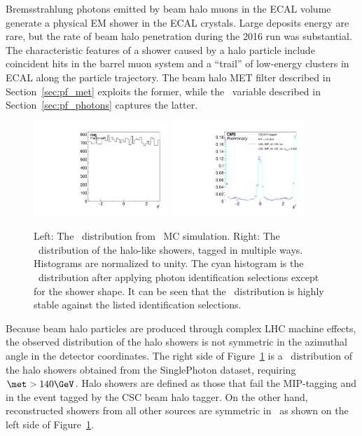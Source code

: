 Bremsstrahlung photons emitted by beam halo muons in the ECAL volume generate a physical EM shower in the ECAL crystals. 
Large deposits energy are rare, but the rate of beam halo penetration during the 2016 run was substantial. 
The characteristic features of a shower caused by a halo particle include coincident hits in the barrel muon system and a ``trail'' of low-energy clusters in ECAL along the particle trajectory. 
The beam halo MET filter described in Section~\ref{sec:pf_met} exploits the former, while the \emip\ variable described in Section~\ref{sec:pf_photons} captures the latter.

\begin{figure}[tbp]
  \begin{center}
    \includegraphics[width=0.45\textwidth]{Reconstruction/Figures/halo/bkgphi.pdf}
    \includegraphics[width=0.45\textwidth]{Reconstruction/Figures/halo/halophi.pdf}
    \caption{
      Left: The \phig\ distribution from \zinvg\ MC simulation. \qquad \qquad
      Right: The \phig\ distribution of the halo-like showers, tagged in multiple ways. 
      Histograms are normalized to unity.
      The cyan histogram is the \phig\ distribution after applying photon identification selections except for the shower shape. 
      It can be seen that the \phig\ distribution is highly stable against the listed identification selections.
    }
    \label{fig:halophi}
  \end{center}
\end{figure}

Because beam halo particles are produced through complex LHC machine effects, the observed distribution of the halo showers is not
symmetric in the azimuthal angle in the detector coordinates.
The right side of Figure~\ref{fig:halophi} is a \phig\ distribution of the halo showers obtained from the SinglePhoton dataset, requiring $\met > 140\GeV$. 
Halo showers are defined as those that fail the MIP-tagging and in the event tagged by the CSC beam halo tagger. 
On the other hand, reconstructed showers from all other sources are symmetric in \phig\, as shown on the left side of Figure~\ref{fig:halophi}. 

